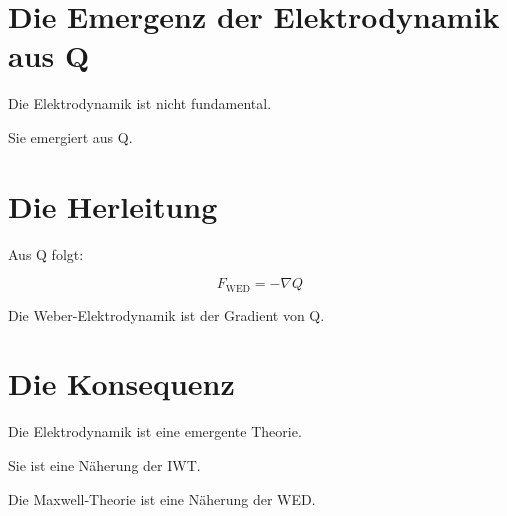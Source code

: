 
\section{Die Emergenz der Elektrodynamik aus Q}

Die Elektrodynamik ist nicht fundamental.

Sie emergiert aus Q.

\section{Die Herleitung}

Aus Q folgt:

\[
F_{\text{WED}} = -\nabla Q
\]

Die Weber-Elektrodynamik ist der Gradient von Q.

\section{Die Konsequenz}

Die Elektrodynamik ist eine emergente Theorie.

Sie ist eine Näherung der IWT.

Die Maxwell-Theorie ist eine Näherung der WED.